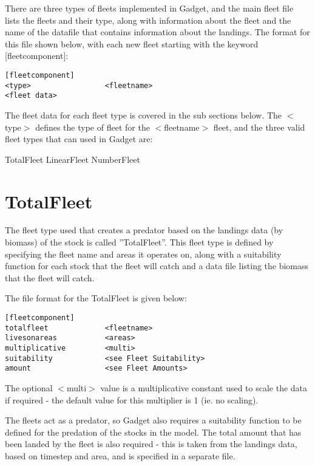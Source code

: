 \documentclass[10pt,twoside]{book}
\begin{document}
There are three types of fleets implemented in Gadget, and the main fleet file lists the fleets and their type, along with information about the fleet and the name of the datafile that contains information about the landings.  The format for this file shown below, with each new fleet starting with the keyword [fleetcomponent]:

{\small\begin{verbatim}
[fleetcomponent]
<type>                 <fleetname>
<fleet data>
\end{verbatim}}

The fleet data for each fleet type is covered in the sub sections below.  The $<$type$>$ defines the type of fleet for the $<$fleetname$>$ fleet, and the three valid fleet types that can used in Gadget are:

\bigskip
TotalFleet\newline
LinearFleet\newline
NumberFleet

\section{TotalFleet}\label{sec:totalfleet}
The fleet type used that creates a predator based on the landings data (by biomass) of the stock is called ''TotalFleet''.  This fleet type is defined by specifying the fleet name and areas it operates on, along with a suitability function for each stock that the fleet will catch and a data file listing the biomass that the fleet will catch.

\bigskip
The file format for the TotalFleet is given below:

{\small\begin{verbatim}
[fleetcomponent]
totalfleet             <fleetname>
livesonareas           <areas>
multiplicative         <multi>
suitability            <see Fleet Suitability>
amount                 <see Fleet Amounts>
\end{verbatim}}

The optional $<$multi$>$ value is a multiplicative constant used to scale the data if required - the default value for this multiplier is 1 (ie. no scaling).

\bigskip
The fleets act as a predator, so Gadget also requires a suitability function to be defined for the predation of the stocks in the model.  The total amount that has been landed by the fleet is also required - this is taken from the landings data, based on timestep and area, and is specified in a separate file.
\end{document}
